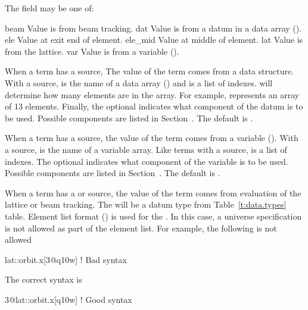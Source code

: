 The  field may be one of:
\begin{example}
  beam        Value is from beam tracking.
  dat         Value is from a \tao datum in a data array ().
  ele         Value at exit end of element.
  ele_mid     Value at middle of element.
  lat         Value is from the lattice.
  var         Value is from a \tao variable ().
\end{example}

When a term has a  source, The value of the term comes from a 
data structure. With a  source,  is the name
of a  data array () and 
 is a list of indexes.  will determine
how many elements are in the array. For example,  
represents an array of 13 elements. Finally, the optional 
indicates what component of the datum is to be used. Possible components are
listed in Section~. The default is .

When a term has a  source, the value of the term comes from a
\tao variable (). With a  source,
 is the name of a  variable array. Like
terms with a  source,  is a list of indexes.
The optional  indicates what component of the variable
is to be used. Possible components are listed in Section~.
The default is .


When a term has a  or  source, the value of the term
comes from evaluation of the lattice or beam tracking. The
 will be a datum type from Table~\ref{t:data.types}
table. Element list format () is used for the
. In this case, a universe specification is not
allowed as part of the element list. For example, the following is not
allowed
\begin{example}
  lat::orbit.x[3@q10w]    ! Bad syntax
\end{example}
The correct syntax is
\begin{example}
  3@lat::orbit.x[q10w]    ! Good syntax
\end{example}

